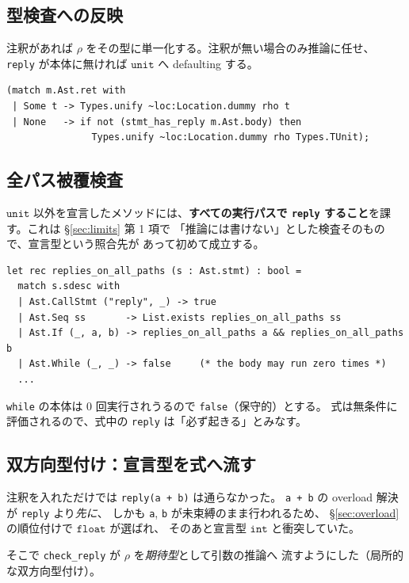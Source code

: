 \documentclass[11pt,a4paper]{ltjsarticle}
\theoremstyle{definition}
\theoremstyle{remark}
\newcommand{\ty}[1]{\ensuremath{\mathtt{#1}}}
\begin{document}
\subsection{型検査への反映}

注釈があれば $\rho$ をその型に単一化する。注釈が無い場合のみ推論に任せ、
\texttt{reply} が本体に無ければ \ty{unit} へ defaulting する。

\begin{lstlisting}
(match m.Ast.ret with
 | Some t -> Types.unify ~loc:Location.dummy rho t
 | None   -> if not (stmt_has_reply m.Ast.body) then
               Types.unify ~loc:Location.dummy rho Types.TUnit);
\end{lstlisting}

\subsection{全パス被覆検査}

\ty{unit} 以外を宣言したメソッドには、\textbf{すべての実行パスで
\texttt{reply} すること}を課す。これは \S\ref{sec:limits} 第 1 項で
「推論には書けない」とした検査そのもので、宣言型という照合先が
あって初めて成立する。

\begin{lstlisting}
let rec replies_on_all_paths (s : Ast.stmt) : bool =
  match s.sdesc with
  | Ast.CallStmt ("reply", _) -> true
  | Ast.Seq ss       -> List.exists replies_on_all_paths ss
  | Ast.If (_, a, b) -> replies_on_all_paths a && replies_on_all_paths b
  | Ast.While (_, _) -> false     (* the body may run zero times *)
  ...
\end{lstlisting}

\texttt{while} の本体は 0 回実行されうるので \texttt{false}（保守的）とする。
式は無条件に評価されるので、式中の \texttt{reply} は「必ず起きる」とみなす。

\subsection{双方向型付け：宣言型を式へ流す}
\label{sec:bidir}

注釈を入れただけでは \texttt{reply(a + b)} は通らなかった。
\texttt{a + b} の overload 解決が \texttt{reply} より\emph{先に}、
しかも \texttt{a}, \texttt{b} が未束縛のまま行われるため、
\S\ref{sec:overload} の順位付けで \ty{float} が選ばれ、
そのあと宣言型 \ty{int} と衝突していた。

そこで \texttt{check\_reply} が $\rho$ を\emph{期待型}として引数の推論へ
流すようにした（局所的な双方向型付け）。
\end{document}
